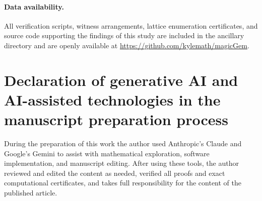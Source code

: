 \documentclass[11pt,a4paper]{article}
\theoremstyle{plain}
\theoremstyle{definition}
\theoremstyle{remark}
\begin{document}
\paragraph{Data availability.} All verification scripts, witness arrangements, lattice enumeration certificates, and source code supporting the findings of this study are included in the ancillary directory and are openly available at \url{https://github.com/kylemath/magicGem}.

\section*{Declaration of generative AI and AI-assisted technologies in the manuscript preparation process}
\label{sec:ai_statement}
During the preparation of this work the author used Anthropic's Claude and Google's Gemini to assist with mathematical exploration, software implementation, and manuscript editing. After using these tools, the author reviewed and edited the content as needed, verified all proofs and exact computational certificates, and takes full responsibility for the content of the published article.
\end{document}
